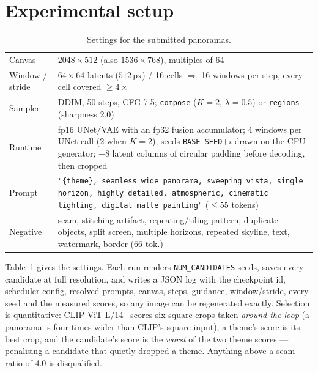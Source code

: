 \documentclass[10pt,a4paper,twocolumn]{article}
\newcommand{\tw}[1]{\texttt{\footnotesize #1}}
\begin{document}
\section{Experimental setup}

\begin{table}[t]
\centering\small
\caption{Settings for the submitted panoramas.}
\label{tab:setup}
\begin{tabularx}{\columnwidth}{@{}>{\raggedright\arraybackslash}p{1.85cm}@{\hspace{4pt}}>{\raggedright\arraybackslash}X@{}}
\toprule
Canvas & $2048\times512$ (also $1536\times768$), multiples of 64\\
Window / stride & $64\times64$ latents ($512$\,px) / 16 cells $\Rightarrow$ 16 windows per step, every cell covered ${\geq}4\times$\\
Sampler & DDIM, 50 steps, CFG 7.5; \tw{compose} ($K{=}2$, $\lambda{=}0.5$) or \tw{regions} (sharpness 2.0)\\
Runtime & fp16 UNet/VAE with an fp32 fusion accumulator; 4 windows per UNet call (2 when $K{=}2$); seeds \tw{BASE\_SEED}$+i$ drawn on the CPU generator; $\pm 8$ latent columns of circular padding before decoding, then cropped\\
Prompt & \tw{"\{theme\}, seamless wide panorama, sweeping vista, single horizon, highly detailed, atmospheric, cinematic lighting, digital matte painting"} (${\leq}55$ tokens)\\
Negative & seam, stitching artifact, repeating/tiling pattern, duplicate objects, split screen, multiple horizons, repeated skyline, text, watermark, border (66 tok.)\\
\bottomrule
\end{tabularx}
\end{table}

Table~\ref{tab:setup} gives the settings. Each run renders
\tw{NUM\_CANDIDATES} seeds, saves every candidate at full resolution, and writes a
JSON log with the checkpoint id, scheduler config, resolved prompts, canvas,
steps, guidance, window/stride, every seed and the measured scores, so any image
can be regenerated exactly. Selection is quantitative: CLIP ViT-L/14~\cite{clip}
scores six square crops taken \emph{around the loop} (a panorama is four times
wider than CLIP's square input), a theme's score is its best crop, and the
candidate's score is the \emph{worst} of the two theme scores --- penalising a
candidate that quietly dropped a theme. Anything above a seam ratio of 4.0 is
disqualified.
\end{document}

